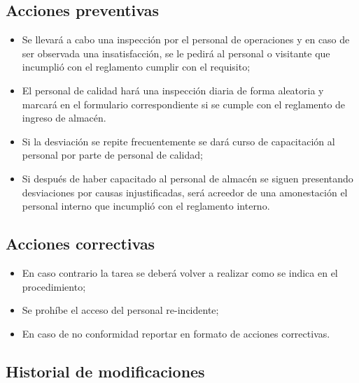 \subsection{Acciones preventivas}

\begin{itemize}
	\item Se llevará a cabo una inspección por el personal de operaciones y en caso de ser observada una insatisfacción, se le pedirá al personal o visitante que incumplió con el reglamento cumplir con el requisito;
	\item El personal de calidad hará una inspección diaria de forma aleatoria y marcará en el formulario correspondiente si se cumple con el reglamento de ingreso de almacén.
	\item Si la desviación se repite frecuentemente se dará curso de capacitación al personal por parte de personal de calidad;
	\item Si después de haber capacitado al personal de almacén se siguen presentando desviaciones por causas injustificadas, será acreedor de una amonestación el personal interno que incumplió con el reglamento interno.
\end{itemize}

\subsection{Acciones correctivas}

\begin{itemize}
	\item En caso contrario la tarea se deberá volver a realizar como se indica en el procedimiento;
	\item Se prohíbe el acceso del personal re-incidente;
	\item En caso de no conformidad reportar en formato de acciones correctivas.
\end{itemize}

\subsection{Historial de modificaciones}

